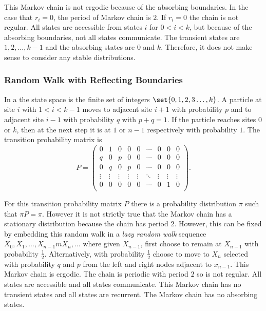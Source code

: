 \documentclass[12pt]{article}
\begin{document}
This Markov chain is not ergodic because of the absorbing boundaries. In
the case that \( r_i = 0 \), the period of Markov chain is \( 2 \). If \(
r_i = 0 \) the chain is not regular.  All states are accessible from
states \( i \) for \( 0 < i < k \), but because of the absorbing
boundaries, not all states communicate.  The transient states are \( 1,
2, \dots, k-1 \) and the absorbing states are \( 0 \) and \( k \).
Therefore, it does not make sense to consider any stable distributions.

\subsubsection*{Random Walk with Reflecting Boundaries}

In a  the state space is
the finite set of integers \( \set{0, 1, 2, 3 \dots, k} \).  A particle
at%
site \( i \) with \( 1 < i < k-1 \) moves to adjacent site \( i+1 \)
with probability \( p \) and to adjacent site \( i-1 \) with probability
\( q \) with \( p+q = 1 \).  If the particle reaches sites \( 0 \) or \(
k \), then at the next step it is at \( 1 \) or \( n-1 \) respectively
with probability \( 1 \).  The transition probability matrix is
\[
    P =
    \begin{pmatrix}
        0 & 1 & 0 & 0 & 0 & \cdots & 0 & 0 & 0 \\
        q & 0 & p & 0 & 0 & \cdots & 0 & 0 & 0 \\
        0 & q & 0 & p & 0 & \cdots & 0 & 0 & 0 \\
        \vdots & \vdots & \vdots & \vdots & \vdots & \ddots & \vdots &
        \vdots & \vdots \\
        0 & 0 & 0 & 0 & 0 & \cdots & 0 & 1 & 0 \\
    \end{pmatrix}
    .
\]

For this transition probability matrix \( P \) there is a probability
distribution \( \pi \) such that \( \pi P = \pi \).  However it is not
strictly true that the Markov chain has a stationary distribution
because the chain has period \( 2 \).  However, this can be fixed by
embedding this random walk in a \emph{lazy random walk}%
sequence \( X_0, X_1, \dots, X_{n-1}m X_n, \dots \) where given \( X_{n-1}
\), first choose to remain at \( X_{n-1} \) with probability \( \frac{1}
{2} \).  Alternatively, with probability \( \frac{1}{2} \) choose to
move to \( X_n \) selected with probability \( q \) and \( p \) from the
left and right nodes adjacent to \( x_{n-1} \).  This Markov chain is
ergodic.  The chain is periodic with period \( 2 \) so is not regular.
All states are accessible and all states communicate.  This Markov chain
has no transient states and all states are recurrent.  The Markov chain
has no absorbing states.
\end{document}
